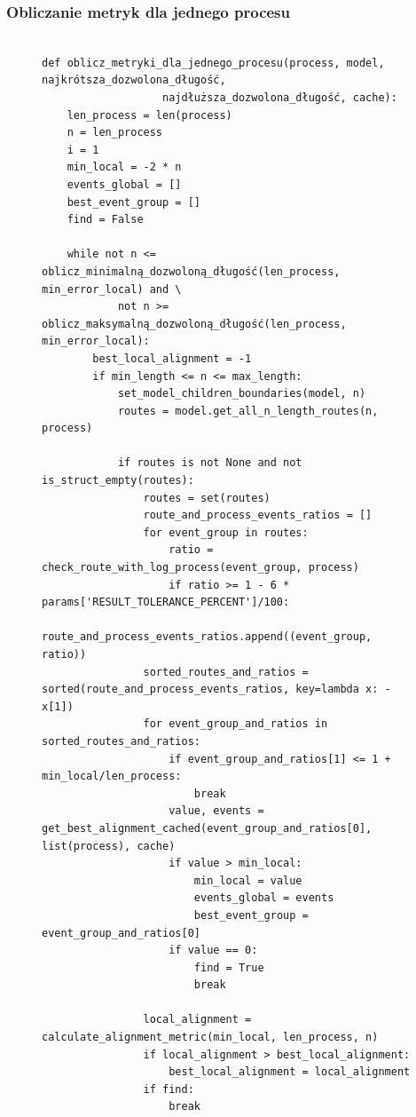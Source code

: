 \subsubsection{Obliczanie metryk dla jednego procesu}
\clearpage
\begin{figure}[!ht]
\lstset{caption=Obliczanie metryk dla jednego procesu, captionpos=b}
\lstset{label=src:best_result, frame=single}
\begin{lstlisting}

def oblicz_metryki_dla_jednego_procesu(process, model, najkrótsza_dozwolona_długość, 
				   najdłuższa_dozwolona_długość, cache):
    len_process = len(process)
    n = len_process
    i = 1
    min_local = -2 * n
    events_global = []
    best_event_group = []
    find = False

    while not n <= oblicz_minimalną_dozwoloną_długość(len_process, min_error_local) and \
            not n >= oblicz_maksymalną_dozwoloną_długość(len_process, min_error_local):
        best_local_alignment = -1
        if min_length <= n <= max_length:
            set_model_children_boundaries(model, n)
            routes = model.get_all_n_length_routes(n, process)

            if routes is not None and not is_struct_empty(routes):
                routes = set(routes)
                route_and_process_events_ratios = []
                for event_group in routes:
                    ratio = check_route_with_log_process(event_group, process)
                    if ratio >= 1 - 6 * params['RESULT_TOLERANCE_PERCENT']/100:
                        route_and_process_events_ratios.append((event_group, ratio))
                sorted_routes_and_ratios = sorted(route_and_process_events_ratios, key=lambda x: -x[1])
                for event_group_and_ratios in sorted_routes_and_ratios:
                    if event_group_and_ratios[1] <= 1 + min_local/len_process:
                        break
                    value, events = get_best_alignment_cached(event_group_and_ratios[0], list(process), cache)
                    if value > min_local:
                        min_local = value
                        events_global = events
                        best_event_group = event_group_and_ratios[0]
                    if value == 0:
                        find = True
                        break

                local_alignment = calculate_alignment_metric(min_local, len_process, n)
                if local_alignment > best_local_alignment:
                    best_local_alignment = local_alignment
                if find:
                    break


\end{lstlisting}
\end{figure}
